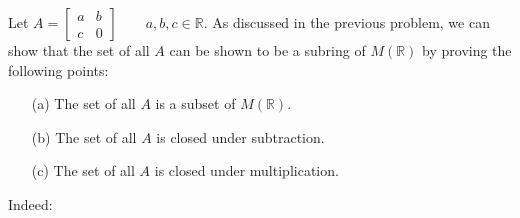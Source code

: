 \documentclass{article}
\begin{document}
\begin{enumerate}
			Let $A = \begin{bmatrix} a & b \\ c & 0 \end{bmatrix} \qquad a, b, c \in \mathbb{R}$.
			As discussed in the previous problem, we can show that the set of all $A$ can be shown
			to be a subring of $M(\mathbb{R})$ by proving the following points:

			\begin{enumerate}
				\item [(a)] The set of all $A$ is a subset of $M(\mathbb{R})$.
				\item [(b)] The set of all $A$ is closed under subtraction.
				\item [(c)] The set of all $A$ is closed under multiplication.
			\end{enumerate}

			Indeed:


\end{enumerate}
\end{document}
